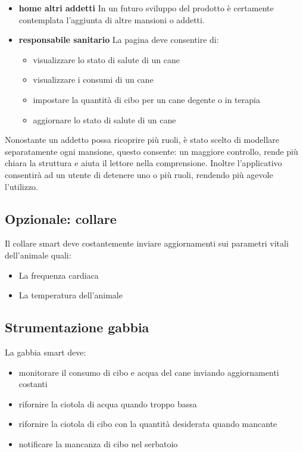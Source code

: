 \begin{itemize}
            \item \textbf{home altri addetti}
                In un futuro sviluppo del prodotto è certamente contemplata l'aggiunta di altre mansioni o addetti.
            \item \textbf{responsabile sanitario}
                La pagina deve consentire di:
               \begin{itemize}
                    \item visualizzare lo stato di salute di un cane
                    \item visualizzare i consumi di un cane
                    \item impostare la quantità di cibo per un cane degente o in terapia
                    \item aggiornare lo stato di salute di un cane
                \end{itemize}
        \end{itemize}
        
    Nonostante un addetto possa ricoprire più ruoli, è stato scelto di modellare separatamente ogni mansione, questo consente: un maggiore controllo, rende più chiara la struttura e aiuta il lettore nella comprensione.
    Inoltre l'applicativo consentirà ad un utente di detenere uno o più ruoli, rendendo più agevole l'utilizzo. 
    \subsection{Opzionale: collare}
        Il collare smart deve costantemente inviare aggiornamenti sui parametri vitali dell'animale quali:
            \begin{itemize}
                \item La frequenza cardiaca
                \item La temperatura dell'animale
            \end{itemize}
    \subsection{Strumentazione gabbia}
        La gabbia smart deve:
            \begin{itemize}
                \item monitorare il consumo di cibo e acqua del cane inviando aggiornamenti costanti
                \item rifornire la ciotola di acqua quando troppo bassa
                \item rifornire la ciotola di cibo con la quantità desiderata quando
                mancante
                \item notificare la mancanza di cibo nel serbatoio
            \end{itemize}
